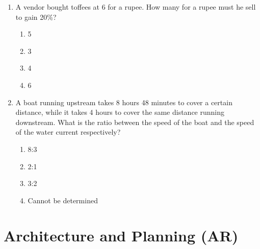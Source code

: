 \documentclass[a4paper,10pt]{article}
\begin{document}
\begin{enumerate}
    \item A vendor bought toffees at 6 for a rupee. How many for a rupee must he sell to gain 20\%?
    \begin{multicols}{4}
    \begin{enumerate}
        \item 5
        \item 3
        \item 4
        \item 6
    \end{enumerate}
    \end{multicols}
    
    \item A boat running upstream takes 8 hours 48 minutes to cover a certain distance, while it takes 4 hours to cover the same distance running downstream. What is the ratio between the speed of the boat and the speed of the water current respectively?
    \begin{multicols}{4}
    \begin{enumerate}
        \item 8:3
        \item 2:1
        \item 3:2
        \item Cannot be determined
    \end{enumerate}
    \end{multicols}
\end{enumerate}

\section*{Architecture and Planning (AR)}
\end{document}
